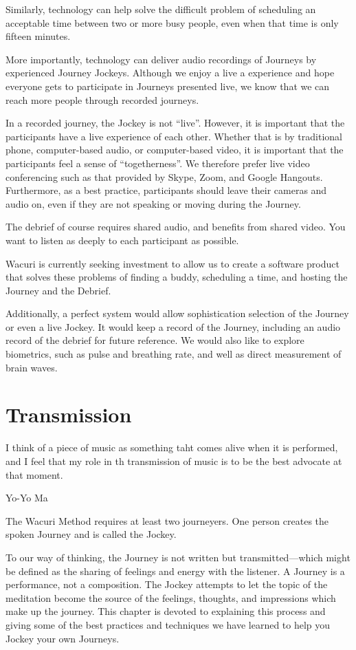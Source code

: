 \documentclass[12pt]{book}
\begin{document}
Similarly, technology can help solve the difficult problem of scheduling an
acceptable time between two or more busy people, even when that time is only fifteen minutes.

More importantly, technology can deliver audio recordings of Journeys by
experienced Journey Jockeys. Although we enjoy a live a experience and hope
everyone gets to participate in Journeys presented live, we know that we
can reach more people through recorded journeys.

In a recorded journey, the Jockey is not ``live''. However, it is
important that the participants have a live experience of each other.
Whether that is by traditional phone, computer-based audio, or computer-based
video, it is important that the participants feel a sense of ``togetherness''.
We therefore prefer live video conferencing such as that provided by Skype,
Zoom, and Google Hangouts. Furthermore, as a best practice, participants
should leave their cameras and audio on, even if they are not speaking or
moving during the Journey.

The debrief of course requires shared audio, and benefits from shared video.
You want to listen as deeply to each participant as possible.

Wacuri is currently seeking investment to allow us to create a software
product that solves these problems of finding a buddy, scheduling a time,
and hosting the Journey and the Debrief.

Additionally, a perfect system would allow sophistication selection of
the Journey or even a live Jockey. It would keep a record of the Journey,
including an audio record of the debrief for future reference. We would
also like to explore biometrics, such as pulse and breathing rate, and
well as direct measurement of brain waves.


\chapter{Transmission}

\epigraph{I think of a piece of music as something taht comes alive when it is performed, and I
feel that my role in th transmission of music is to be the best advocate at that moment.}
         {Yo-Yo Ma}


The Wacuri Method requires at least two journeyers. One person creates
the spoken Journey and is called the Jockey.
					
To our way of thinking, the Journey is not written but
transmitted---which might be defined as the sharing of feelings and
energy with the listener. A Journey is a performance, not a
composition.  The Jockey attempts to let the topic of the meditation
become the source of the feelings, thoughts, and impressions which
make up the journey.  This chapter is devoted to explaining this
process and giving some of the best practices and techniques we have
learned to help you Jockey your own Journeys.
					
\end{document}
